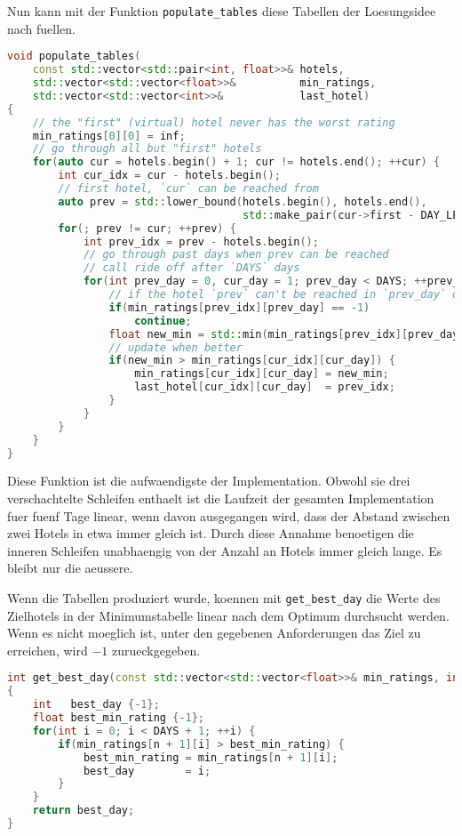\documentclass[a4paper,10pt,ngerman]{scrartcl}
\begin{document}
Nun kann mit der Funktion \lstinline{populate_tables} diese Tabellen der Loesungsidee nach fuellen.
\begin{lstlisting}[language=C++]
void populate_tables(
    const std::vector<std::pair<int, float>>& hotels,
    std::vector<std::vector<float>>&          min_ratings,
    std::vector<std::vector<int>>&            last_hotel)
{
    // the "first" (virtual) hotel never has the worst rating
    min_ratings[0][0] = inf;
    // go through all but "first" hotels
    for(auto cur = hotels.begin() + 1; cur != hotels.end(); ++cur) {
        int cur_idx = cur - hotels.begin();
        // first hotel, `cur` can be reached from
        auto prev = std::lower_bound(hotels.begin(), hotels.end(),
                                     std::make_pair(cur->first - DAY_LEN, .0f));
        for(; prev != cur; ++prev) {
            int prev_idx = prev - hotels.begin();
            // go through past days when prev can be reached
            // call ride off after `DAYS` days
            for(int prev_day = 0, cur_day = 1; prev_day < DAYS; ++prev_day, ++cur_day) {
                // if the hotel `prev` can't be reached in `prev_day` days
                if(min_ratings[prev_idx][prev_day] == -1)
                    continue;
                float new_min = std::min(min_ratings[prev_idx][prev_day], cur->second);
                // update when better
                if(new_min > min_ratings[cur_idx][cur_day]) {
                    min_ratings[cur_idx][cur_day] = new_min;
                    last_hotel[cur_idx][cur_day]  = prev_idx;
                }
            }
        }
    }
}
\end{lstlisting}
Diese Funktion ist die aufwaendigste der Implementation.
Obwohl sie drei verschachtelte Schleifen enthaelt ist die Laufzeit der gesamten Implementation fuer fuenf Tage linear, wenn davon ausgegangen wird, dass der Abstand zwischen zwei Hotels in etwa immer gleich ist.
Durch diese Annahme benoetigen die inneren Schleifen unabhaengig von der Anzahl an Hotels immer gleich lange.
Es bleibt nur die aeussere.

Wenn die Tabellen produziert wurde, koennen mit \lstinline{get_best_day} die Werte des \glqq{}Zielhotels\grqq{} in der Minimumstabelle linear nach dem Optimum durchsucht werden.
Wenn es nicht moeglich ist, unter den gegebenen Anforderungen das Ziel zu erreichen, wird $-1$ zurueckgegeben.
\begin{lstlisting}[language=C++]
int get_best_day(const std::vector<std::vector<float>>& min_ratings, int n)
{
    int   best_day {-1};
    float best_min_rating {-1};
    for(int i = 0; i < DAYS + 1; ++i) {
        if(min_ratings[n + 1][i] > best_min_rating) {
            best_min_rating = min_ratings[n + 1][i];
            best_day        = i;
        }
    }
    return best_day;
}
\end{lstlisting}
\end{document}
